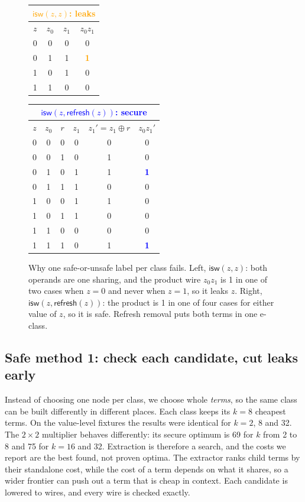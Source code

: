 \documentclass[conference]{IEEEtran}
\newcommand{\rf}{\mathsf{refresh}}
\newcommand{\isw}{\mathsf{isw}}
\begin{document}
\begin{figure}[!t]
\centering
{\footnotesize
\begin{tabular}[t]{cccc}
\multicolumn{4}{c}{\textcolor{orange}{\textbf{$\isw(z,z)$: leaks}}}\\\toprule
$z$ & $z_0$ & $z_1$ & $z_0z_1$\\\midrule
0&0&0&0\\ 0&1&1&\textcolor{orange}{\textbf{1}}\\ 1&0&1&0\\ 1&1&0&0\\\bottomrule
\end{tabular}\hspace{2.2em}
\begin{tabular}[t]{cccccc}
\multicolumn{6}{c}{\textcolor{blue}{\textbf{$\isw(z,\rf(z))$: secure}}}\\\toprule
$z$ & $z_0$ & $r$ & $z_1$ & $z_1'=z_1\oplus r$ & $z_0z_1'$\\\midrule
0&0&0&0&0&0\\ 0&0&1&0&1&0\\ 0&1&0&1&1&\textcolor{blue}{\textbf{1}}\\ 0&1&1&1&0&0\\
1&0&0&1&1&0\\ 1&0&1&1&0&0\\ 1&1&0&0&0&0\\ 1&1&1&0&1&\textcolor{blue}{\textbf{1}}\\\bottomrule
\end{tabular}}
\caption{Why one safe-or-unsafe label per class fails. Left, $\isw(z,z)$: both operands are one sharing, and the product wire $z_0z_1$ is 1 in one of two cases when $z=0$ and never when $z=1$, so it leaks $z$. Right, $\isw(z,\rf(z))$: the product is 1 in one of four cases for either value of $z$, so it is safe. Refresh removal puts both terms in one e-class.}\label{fig:class}
\end{figure}

\subsection{Safe method 1: check each candidate, cut leaks early}
Instead of choosing one node per class, we choose whole \emph{terms}, so the same class can be built differently in different places. Each class keeps its $k=8$ cheapest terms. On the value-level fixtures the results were identical for $k=2$, 8 and 32. The $2{\times}2$ multiplier behaves differently: its secure optimum is 69 for $k$ from 2 to 8 and 75 for $k=16$ and 32. Extraction is therefore a search, and the costs we report are the best found, not proven optima. The extractor ranks child terms by their standalone cost, while the cost of a term depends on what it shares, so a wider frontier can push out a term that is cheap in context. Each candidate is lowered to wires, and every wire is checked exactly.
\end{document}
